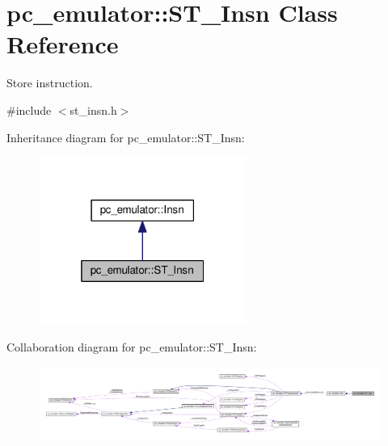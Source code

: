 \hypertarget{classpc__emulator_1_1ST__Insn}{}\section{pc\+\_\+emulator\+:\+:S\+T\+\_\+\+Insn Class Reference}
\label{classpc__emulator_1_1ST__Insn}


Store instruction.  




{\ttfamily \#include $<$st\+\_\+insn.\+h$>$}



Inheritance diagram for pc\+\_\+emulator\+:\+:S\+T\+\_\+\+Insn\+:
\nopagebreak
\begin{figure}[H]
\begin{center}
\leavevmode
\includegraphics[width=193pt]{classpc__emulator_1_1ST__Insn__inherit__graph}
\end{center}
\end{figure}


Collaboration diagram for pc\+\_\+emulator\+:\+:S\+T\+\_\+\+Insn\+:
\nopagebreak
\begin{figure}[H]
\begin{center}
\leavevmode
\includegraphics[width=350pt]{classpc__emulator_1_1ST__Insn__coll__graph}
\end{center}
\end{figure}
